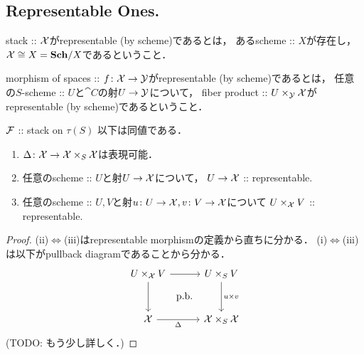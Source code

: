 \subsection{Representable Ones.}
    \begin{Def}
        stack :: $\mathcal{X}$がrepresentable (by scheme)であるとは，
        あるscheme :: $X$が存在し，$\mathcal{X} \cong X=\mathbf{Sch}/X$であるということ．
    \end{Def}

    \begin{Def}
        morphism of spaces :: $f \colon \mathcal{X} \to \mathcal{Y}$がrepresentable (by scheme)であるとは，
        任意の$S$-scheme :: $U$と$\cat{C}$の射$U \to \mathcal{Y}$について，
        fiber product :: $U \times_{\mathcal{Y}} \mathcal{X}$がrepresentable (by scheme)であるということ．
    \end{Def}

    \begin{Prop}
        $\mathcal{F}$ :: stack on $\tau(S)$
        以下は同値である．
        \begin{enumerate}[label=(\roman*)]
            \item
                $\Delta \colon \mathcal{X} \to \mathcal{X} \times_S \mathcal{X}$は表現可能．
            \item
                任意のscheme :: $U$と射$U \to \mathcal{X}$について，
                $U \to \mathcal{X}$ :: representable.
            \item
                任意のscheme :: $U, V$と射$u \colon U \to \mathcal{X}, v \colon V \to \mathcal{X}$について
                $U \times_{\mathcal{X}} V$ :: representable.
        \end{enumerate}
    \end{Prop}
    \begin{proof}
        (ii)$\iff$(iii)はrepresentable morphismの定義から直ちに分かる．
        (i)$\iff$(iii)は以下がpullback diagramであることから分かる．
        \[
            \begin{tikzcd}[sep=30pt]
            U \times_{\shX} V \ar[r]\ar[d]& U \times_{S} V \ar[d, "u \times v"]\\
            \shX \ar[r, "\Diag"']& \shX \times_{S} \shX \ar[lu, phantom, "\text{p.b.}"]
        \end{tikzcd}
        \]
        (TODO: もう少し詳しく．)
    \end{proof}

